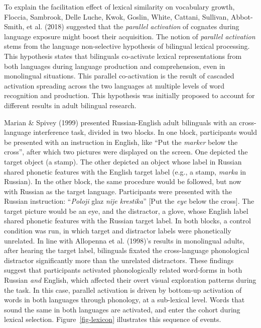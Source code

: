 \documentclass[
  12pt,
  b5paperpaper,
  twoside]{scrreprt}
\begin{document}
To explain the facilitation effect of lexical similarity on vocabulary
growth, Floccia, Sambrook, Delle Luche, Kwok, Goslin, White, Cattani,
Sullivan, Abbot‐Smith, et al. (2018) suggested that the \emph{parallel
activation} of cognates during language exposure might boost their
acquisition. The notion of \emph{parallel activation} stems from the
language non-selective hypothesis of bilingual lexical processing. This
hypothesis states that bilinguals co-activate lexical representations
from both languages during language production and comprehension, even
in monolingual situations. This parallel co-activation is the result of
cascaded activation spreading across the two languages at multiple
levels of word recognition and production. This hypothesis was initially
proposed to account for different results in adult bilingual research.

Marian \& Spivey (1999) presented Russian-English adult bilinguals with
an cross-language interference task, divided in two blocks. In one
block, participants would be presented with an instruction in English,
like ``Put the \emph{marker} below the cross'', after which two pictures
were displayed on the screen. One depicted the target object (a stamp).
The other depicted an object whose label in Russian shared phonetic
features with the English target label (e.g., a stamp, \emph{marka} in
Russian). In the other block, the same procedure would be followed, but
now with Russian as the target language. Participants were presented
with the Russian instruction: ``\emph{Poloji} glaz \emph{nije
krestika}'' {[}Put the \emph{eye} below the cross{]}. The target picture
would be an eye, and the distractor, a glove, whose English label shared
phonetic features with the Russian target label. In both blocks, a
control condition was run, in which target and distractor labels were
phonetically unrelated. In line with Allopenna et al. (1998)'s results
in monolingual adults, after hearing the target label, bilinguals
fixated the cross-language phonological distractor significantly more
than the unrelated distractors. These findings suggest that participants
activated phonologically related word-forms in both Russian \emph{and}
English, which affected their overt visual exploration patterns during
the task. In this case, parallel activation is driven by bottom-up
activation of words in both languages through phonology, at a
sub-lexical level. Words that sound the same in both languages are
activated, and enter the cohort during lexical selection.
Figure~\ref{fig-lexicon} illustrates this sequence of events.
\end{document}
